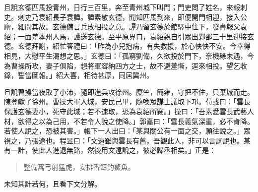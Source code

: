 且說玄德匹馬投青州，日行三百里，奔至青州城下叫門；門吏問了姓名，來報刺史。刺史乃袁紹長子袁譚。譚素敬玄德，聞知匹馬到來，即便開門相迎，接入公廨，細問其故。玄德備言兵敗相投之意。譚乃留玄德於館驛中住下，發書報父袁紹；一面差本州人馬，護送玄德。至平原界口，袁紹親自引眾出鄴邵三十里迎接玄德。玄德拜謝，紹忙答禮曰：「昨為小兒抱病，有失救援，於心怏怏不安。今幸得相見，大慰平生渴想之思。」玄德曰：「孤窮劉備，久欲投於門下，奈機緣未遇，今為曹操所攻，妻子俱陷，想將軍容納四方之士，故不避羞慚，逕來相投。望乞收錄，誓當圖報。」紹大喜，相待甚厚，同居冀州。

且說曹操當夜取了小沛，隨即進兵攻徐州。糜竺，簡雍，守把不住，只棄城而走。陳登獻了徐州。曹操大軍入城，安民己畢，隨喚眾謀士議取下邛。荀彧曰：「雲長保護玄德妻小，死守此城；若不速取，恐為袁紹所竊。」操曰：「吾素愛雲長武藝人材，欲得之以為己用，不若令人說之使降。」郭嘉曰：「雲長義氣深重，必不肯降。若使人說之，恐被其害。」帳下一人出曰：「某與關公有一面之交，願往說之。」眾視之，乃張遼也。程昱曰：「文遠雖與雲長有舊，吾觀此人，非可以言詞說也。某有一計，使此人進退無路，然後用文遠說之，彼必歸丞相矣。」正是：

\begin{quote}
整備窩弓射猛虎，安排香餌釣鰲魚。
\end{quote}

未知其計若何，且看下文分解。
